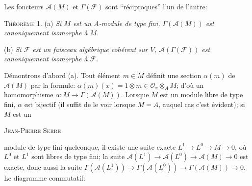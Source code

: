 Les foncteurs $\mathcal{A}(M)$ et $\Gamma(\mathcal{F})$ sont ``réciproques'' l'un de l'autre:

\textsc{Théorème} 1. (a) \textit{Si $M$ est un $A$-module de type fini, $\Gamma(\mathcal{A}(M))$ est canoniquement isomorphe à $M$.}

(b) \textit{Si $\mathcal{F}$ est un faisceau algébrique cohérent sur $V$, $\mathcal{A}(\Gamma(\mathcal{F}))$ est canoniquement isomorphe à $\mathcal{F}$.}

Démontrons d'abord (a). Tout élément $m \in M$ définit une section $\alpha(m)$ de $\mathcal{A}(M)$ par la formule: $\alpha(m)(x) = 1 \otimes m \in \mathcal{O}_x \otimes_A M$; d'où un homomorphisme $\alpha : M \to \Gamma(\mathcal{A}(M))$. Lorsque $M$ est un module libre de type fini, $\alpha$ est bijectif (il suffit de le voir lorsque $M = A$, auquel cas c'est évident); si $M$ est un 




\textsc{Jean-Pierre Serre}

 module de type fini quelconque, il existe une suite exacte $L^1 \to L^0 \to M \to 0$, où $L^0$ et $L^1$ sont libres de type fini; la suite $\mathcal{A}(L^1) \to \mathcal{A}(L^0) \to \mathcal{A}(M) \to 0$ est exacte, donc aussi la suite $\Gamma(\mathcal{A}(L^1)) \to \Gamma(\mathcal{A}(L^0)) \to \Gamma(\mathcal{A}(M)) \to 0$. Le diagramme commutatif:

